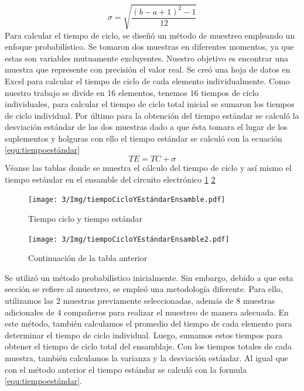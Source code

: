           \begin{equation}
                \label{equ:desviaciónestándar}
                \sigma = \sqrt{\dfrac{(b-a+1)^2-1}{12}}
            \end{equation}
    Para calcular el tiempo de ciclo, se diseñó un método de muestreo empleando un enfoque probabilístico. Se tomaron dos muestras en diferentes momentos, ya que estas son variables mutuamente excluyentes. Nuestro objetivo es encontrar una muestra que represente con precisión el valor real.
    Se creó una hoja de datos en Excel para calcular el tiempo de ciclo de cada elemento individualmente. Como nuestro trabajo se divide en 16 elementos, tenemos 16 tiempos de ciclo individuales, para calcular el tiempo de ciclo total inicial se sumaron los tiempos de ciclo individual. Por último para la
    obtención del tiempo estándar se calculó la desviación estándar de las dos muestras dado a que ésta tomara el lugar de los suplementos y holguras con ello el tiempo estándar se calculó con la ecuación \ref{equ:tiempoestándar}
    \begin{equation}
                \label{equ:tiempoestándar}
               TE= TC + \sigma
            \end{equation}
    Véanse las tablas donde se muestra el cálculo del tiempo de ciclo y así mismo el tiempo estándar en el ensamble del circuito electrónico \ref{fig:tiempoCicloYEstándarEnsamble} \ref{fig:tiempoCicloYEstándarEnsamble2}
    \begin{figure}[H]
        \centering
        \texttt{[image: 3/Img/tiempoCicloYEstándarEnsamble.pdf]}
        \caption{Tiempo ciclo y tiempo estándar} 
        \label{fig:tiempoCicloYEstándarEnsamble}
    \end{figure}
    \begin{figure}[H]
        \centering
        \texttt{[image: 3/Img/tiempoCicloYEstándarEnsamble2.pdf]}
        \caption{Continuación de la tabla anterior} 
        \label{fig:tiempoCicloYEstándarEnsamble2}
    \end{figure}
    Se utilizó un método probabilístico inicialmente. Sin embargo, debido a que esta sección se refiere al muestreo, se empleó una metodología diferente. Para ello, utilizamos las 2 muestras previamente seleccionadas, además de 8 muestras adicionales de 4 compañeros para realizar el muestreo de manera adecuada. En este método, también calculamos el promedio del tiempo de cada elemento para determinar el tiempo de ciclo individual. Luego, sumamos estos tiempos para obtener el tiempo de ciclo total del ensamblaje. Con los tiempos totales de cada muestra, también calculamos la varianza y la desviación estándar. Al igual que con el método anterior el tiempo estándar se calculó con la formula \ref{equ:tiempoestándar}. 
